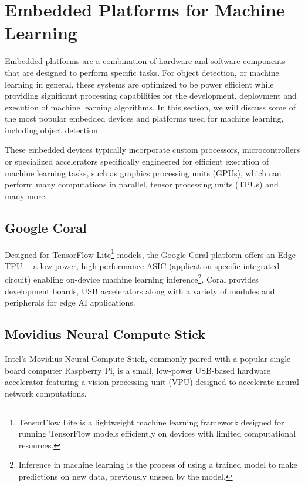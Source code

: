 \section{Embedded Platforms for Machine Learning}

Embedded platforms are a combination of hardware and software components that
are designed to perform specific tasks. For object detection, or machine
learning in general, these systems are optimized to be power efficient while
providing significant processing capabilities for the development, deployment and
execution of machine learning algorithms. In this section, we will discuss some
of the most popular embedded devices and platforms used for machine learning,
including object detection.

These embedded devices typically incorporate custom processors, microcontrollers
or specialized accelerators specifically engineered for efficient execution of
machine learning tasks, such as graphics processing units (GPUs), which can
perform many computations in parallel, tensor processing units (TPUs) and many
more.

\subsection{Google Coral}

Designed for TensorFlow Lite\footnote{TensorFlow Lite is a lightweight machine
learning framework designed for running TensorFlow models efficiently on devices
with limited computational resources.} models, the Google Coral platform offers
an Edge TPU\,---\,a low-power, high-performance ASIC (application-specific
integrated circuit) enabling on-device machine learning
inference\footnote{Inference in machine learning is the process of using a
trained model to make predictions on new data, previously unseen by the model.}.
Coral provides development boards, USB accelerators along with a variety of
modules and peripherals for edge AI applications.


\subsection{Movidius Neural Compute Stick}

Intel's Movidius Neural Compute Stick, commonly paired with a popular
single-board computer Raspberry Pi, is a small, low-power USB-based hardware
accelerator featuring a vision processing unit (VPU) designed to accelerate
neural network computations.


